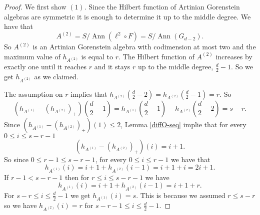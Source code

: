 \documentclass[12pt]{amsart}
\numberwithin{equation}{section}
\theoremstyle{plain} \newtheorem{theorem}{Theorem}[section]
\theoremstyle{definition} \newtheorem{definition}[theorem]{Definition}
\DeclareMathOperator{\ann}{Ann}\DeclareMathOperator{\Char}{char}
\begin{document}
\begin{proof}
We first show $(1)$. Since the Hilbert function of Artinian    Gorenstein algebras are symmetric it is enough to determine it up to the middle degree.
We have that 
$$
A^{(2)} = S/\ann(\ell^2\circ F) = S/\ann(G_{d-2}).
$$
So $A^{(2)}$ is an Artinian    Gorenstein algebra with codimension at most two and the maximum value of $h_{A^{(2)}}$ is equal to $r$. The Hilbert function of $A^{(2)}$ increases by exactly one until it reaches $r$ and it stays $r$ up to the middle degree, $\frac{d}{2}-1$. So we get $h_{A^{(2)}}$ as we claimed.\par 
The assumption on $r$ implies that $h_{A^{(2)}}(\frac{d}{2}-2)=h_{A^{(2)}}(\frac{d}{2}-1)=r$. So 
$$
(h_{A^{(1)}}-(h_{A^{(2)}})_+)(\frac{d}{2}-1) = h_{A^{(1)}}(\frac{d}{2}-1)-h_{A^{(2)}}(\frac{d}{2}-2) = s-r.
$$
Since $(h_{A^{(1)}}-(h_{A^{(2)}})_+)(1)\leq 2$, Lemma \ref{diffO-seq} implie that for every $0\leq i\leq s-r-1$
$$(h_{A^{(1)}}-(h_{A^{(2)}})_+)(i)=i+1.$$
So since $0\leq r-1\leq s-r-1$, for every $0\leq i\leq r-1$ we have that 
$$
h_{A^{(1)}}(i) = i+1+h_{A^{(2)}}(i-1)= i+1+i = 2i+1.
$$
If $r-1< s-r-1$ then for $r\leq i\leq s-r-1$ we have 
$$
h_{A^{(1)}}(i) = i+1+h_{A^{(2)}}(i-1)= i+1+r.
$$
For $s-r\leq i\leq \frac{d}{2}-1$ we get $h_{A^{(1)}}(i) = s$. This is because we assumed $r\leq s-r$ so we have  $h_{A^{(2)}}(i)=r$ for $s-r-1\leq i\leq \frac{d}{2}-1$. 


\end{proof}
\end{document}
